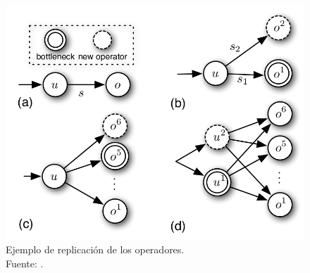 \begin{figure}[!ht]
	\centering
	\includegraphics[scale=0.3]{images/EjFision.png}
	\caption[Ejemplo de replicaci\'on de los operadores.]{Ejemplo de replicaci\'on de los operadores.\\Fuente: \cite{FernandezMKP13}.}
	\label{fig:ejFision}
\end{figure}